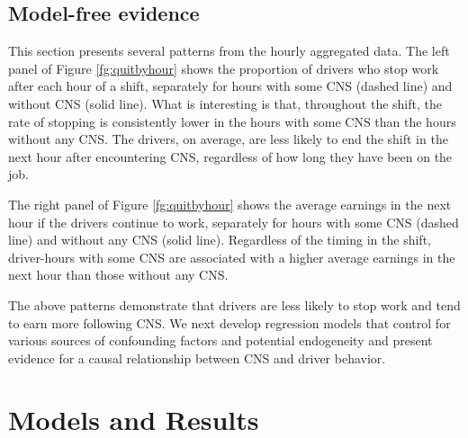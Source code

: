 \documentclass[reviewmode,AEJ]{AEA}
\begin{document}
\subsection{Model-free evidence}
This section presents several patterns from the hourly aggregated data. %
The left panel of Figure \ref{fg:quitbyhour}
shows the proportion of drivers who stop work after each hour of a shift, separately for
hours with some CNS (dashed line) and without CNS (solid line).
What is interesting is that, throughout the shift, the rate of stopping is consistently lower in the hours with some CNS than the hours without any CNS. The drivers, on average, are less likely to end the shift in the next hour after encountering CNS, regardless of how long they have been on the job.

The right panel of Figure \ref{fg:quitbyhour} shows the average earnings in the next hour if the drivers continue to work, separately for hours with some CNS (dashed line) and without any CNS (solid line).
Regardless of the timing in the shift, driver-hours with some CNS are associated with a higher average earnings in the next hour than those without any CNS.


The above patterns demonstrate %
that drivers are less likely to stop work and tend to earn more following CNS. %
We next develop regression models that control for various sources of confounding factors and
potential endogeneity and present evidence for a causal relationship between CNS and driver behavior.

\section{Models and Results}
\label{sec:main}
\end{document}
